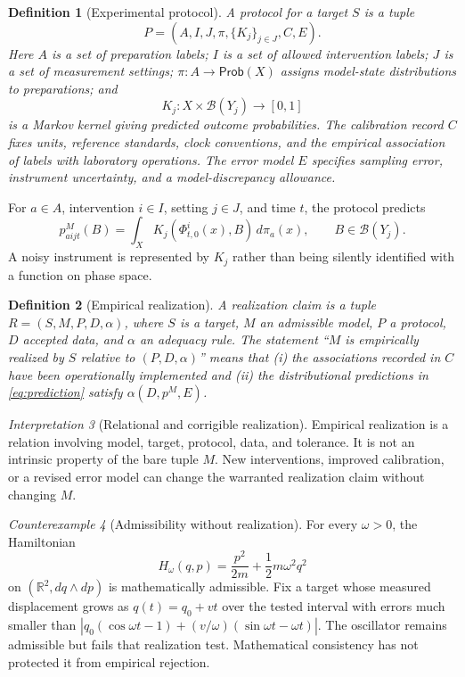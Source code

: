 \documentclass[11pt]{article}
\newtheorem{definition}{Definition}[section]
\theoremstyle{remark}
\newtheorem{interpretation}[definition]{Interpretation}
\newtheorem{counterexample}[definition]{Counterexample}
\newcommand{\Real}{\mathbb{R}}
\newcommand{\Prob}{\mathsf{Prob}}
\begin{document}
\begin{definition}[Experimental protocol]\label{def:protocol}
A protocol for a target $S$ is a tuple
\[
 P=(A,I,J,\pi,\{K_j\}_{j\in J},C,E).
\]
Here $A$ is a set of preparation labels; $I$ is a set of allowed intervention labels; $J$ is a set of measurement settings; $\pi:A\to\Prob(X)$ assigns model-state distributions to preparations; and
\[
 K_j:X\times\mathcal B(Y_j)\longrightarrow[0,1]
\]
is a Markov kernel giving predicted outcome probabilities.  The calibration record $C$ fixes units, reference standards, clock conventions, and the empirical association of labels with laboratory operations.  The error model $E$ specifies sampling error, instrument uncertainty, and a model-discrepancy allowance.
\end{definition}
For $a\in A$, intervention $i\in I$, setting $j\in J$, and time $t$, the protocol predicts
\begin{equation}\label{eq:prediction}
 p^M_{aijt}(B)=\int_X K_j\!\left(\Phi^i_{t,0}(x),B\right)\,d\pi_a(x),
 \qquad B\in\mathcal B(Y_j).
\end{equation}
A noisy instrument is represented by $K_j$ rather than being silently identified with a function on phase space.

\begin{definition}[Empirical realization]\label{def:realization}
A realization claim is a tuple $R=(S,M,P,D,\alpha)$, where $S$ is a target, $M$ an admissible model, $P$ a protocol, $D$ accepted data, and $\alpha$ an adequacy rule.  The statement ``$M$ is empirically realized by $S$ relative to $(P,D,\alpha)$'' means that (i) the associations recorded in $C$ have been operationally implemented and (ii) the distributional predictions in \eqref{eq:prediction} satisfy $\alpha(D,p^M,E)$.
\end{definition}

\begin{interpretation}[Relational and corrigible realization]\label{int:relative}
Empirical realization is a relation involving model, target, protocol, data, and tolerance.  It is not an intrinsic property of the bare tuple $M$.  New interventions, improved calibration, or a revised error model can change the warranted realization claim without changing $M$.
\end{interpretation}

\begin{counterexample}[Admissibility without realization]\label{cx:oscillator}
For every $\omega>0$, the Hamiltonian
\[
 H_\omega(q,p)=\frac{p^2}{2m}+\frac12m\omega^2q^2
\]
on $(\Real^2,dq\wedge dp)$ is mathematically admissible.  Fix a target whose measured displacement grows as $q(t)=q_0+vt$ over the tested interval with errors much smaller than $|q_0(\cos\omega t-1)+(v/\omega)(\sin\omega t-\omega t)|$.  The oscillator remains admissible but fails that realization test.  Mathematical consistency has not protected it from empirical rejection.
\end{counterexample}
\end{document}
